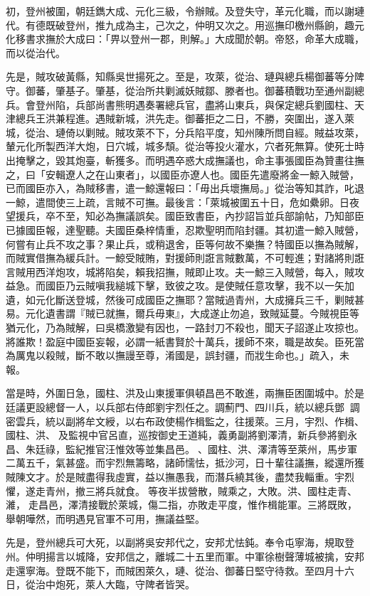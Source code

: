 \begin{pinyinscope}
初，登州被圍，朝廷鐫大成、元化三級，令辦賊。及登失守，革元化職，而以謝璉代。有德既破登州，推九成為主，己次之，仲明又次之。用巡撫印檄州縣餉，趣元化移書求撫於大成曰：「畀以登州一郡，則解。」大成聞於朝。帝怒，命革大成職，而以從治代。

先是，賊攻破黃縣，知縣吳世揚死之。至是，攻萊，從治、璉與總兵楊御蕃等分陴守。御蕃，肇基子。肇基，從治所共剿滅妖賊鄒、滕者也。御蕃積戰功至通州副總兵。會登州陷，兵部尚書熊明遇奏署總兵官，盡將山東兵，與保定總兵劉國柱、天津總兵王洪兼程進。遇賊新城，洪先走。御蕃拒之二日，不勝，突圍出，遂入萊城，從治、璉倚以剿賊。賊攻萊不下，分兵陷平度，知州陳所問自經。賊益攻萊，輦元化所製西洋大炮，日穴城，城多頹。從治等投火灌水，穴者死無算。使死士時出掩擊之，毀其炮臺，斬獲多。而明遇卒惑大成撫議也，命主事張國臣為贊畫往撫之，曰「安輯遼人之在山東者」，以國臣亦遼人也。國臣先遣廢將金一鯨入賊營，已而國臣亦入，為賊移書，遣一鯨還報曰：「毋出兵壞撫局。」從治等知其詐，叱退一鯨，遣間使三上疏，言賊不可撫。最後言：「萊城被圍五十日，危如纍卵。日夜望援兵，卒不至，知必為撫議誤矣。國臣致書臣，內抄詔旨並兵部諭帖，乃知部臣已據國臣報，達聖聽。夫國臣桑梓情重，忍欺聖明而陷封疆。其初遣一鯨入賊營，何嘗有止兵不攻之事？果止兵，或稍退舍，臣等何故不樂撫？特國臣以撫為賊解，而賊實借撫為緩兵計。一鯨受賊賄，對援師則誑言賊數萬，不可輕進；對諸將則誑言賊用西洋炮攻，城將陷矣，賴我招撫，賊即止攻。夫一鯨三入賊營，每入，賊攻益急。而國臣乃云賊嗔我縋城下擊，致彼之攻。是使賊任意攻擊，我不以一矢加遺，如元化斷送登城，然後可成國臣之撫耶？當賊過青州，大成擁兵三千，剿賊甚易。元化遺書謂『賊已就撫，爾兵毋東』，大成遂止勿追，致賊延蔓。今賊視臣等猶元化，乃為賊解，曰吳橋激變有因也，一路封刀不殺也，聞天子詔遂止攻掠也。將誰欺！盈庭中國臣妄報，必謂一紙書賢於十萬兵，援師不來，職是故矣。臣死當為厲鬼以殺賊，斷不敢以撫謾至尊，淆國是，誤封疆，而戕生命也。」疏入，未報。

當是時，外圍日急，國柱、洪及山東援軍俱頓昌邑不敢進，兩撫臣困圍城中。於是廷議更設總督一人，以兵部右侍郎劉宇烈任之。調薊門、四川兵，統以總兵鄧，調密雲兵，統以副將牟文綬，以右布政使楊作楫監之，往援萊。三月，宇烈、作楫、國柱、洪、及監視中官呂直，巡按御史王道純，義勇副將劉澤清，新兵參將劉永昌、朱廷祿，監紀推官汪惟效等並集昌邑。、國柱、洪、澤清等至萊州，馬步軍二萬五千，氣甚盛。而宇烈無籌略，諸師懦怯，抵沙河，日十輩往議撫，縱還所獲賊陳文才。於是賊盡得我虛實，益以撫愚我，而潛兵繞其後，盡焚我輜重。宇烈懼，遂走青州，撤三將兵就食。等夜半拔營散，賊乘之，大敗。洪、國柱走青、濰，走昌邑，澤清接戰於萊城，傷二指，亦敗走平度，惟作楫能軍。三將既敗，舉朝嘩然，而明遇見官軍不可用，撫議益堅。

先是，登州總兵可大死，以副將吳安邦代之，安邦尤怯鈍。奉令屯寧海，規取登州。仲明揚言以城降，安邦信之，離城二十五里而軍。中軍徐樹聲薄城被擒，安邦走還寧海。登既不能下，而賊困萊久，璉、從治、御蕃日堅守待救。至四月十六日，從治中炮死，萊人大臨，守陴者皆哭。


\end{pinyinscope}
